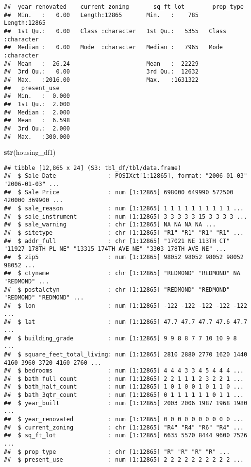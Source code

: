 \documentclass[
]{article}
\newenvironment{Shaded}{\begin{snugshade}}{\end{snugshade}}
\newcommand{\KeywordTok}[1]{\textcolor[rgb]{0.13,0.29,0.53}{\textbf{#1}}}
\newcommand{\NormalTok}[1]{#1}
\begin{document}
\begin{verbatim}
##  year_renovated    current_zoning       sq_ft_lot        prop_type        
##  Min.   :   0.00   Length:12865       Min.   :    785   Length:12865      
##  1st Qu.:   0.00   Class :character   1st Qu.:   5355   Class :character  
##  Median :   0.00   Mode  :character   Median :   7965   Mode  :character  
##  Mean   :  26.24                      Mean   :  22229                     
##  3rd Qu.:   0.00                      3rd Qu.:  12632                     
##  Max.   :2016.00                      Max.   :1631322                     
##   present_use     
##  Min.   :  0.000  
##  1st Qu.:  2.000  
##  Median :  2.000  
##  Mean   :  6.598  
##  3rd Qu.:  2.000  
##  Max.   :300.000
\end{verbatim}

\begin{Shaded}
\begin{Highlighting}[]
\KeywordTok{str}\NormalTok{(housing_df1)}
\end{Highlighting}
\end{Shaded}

\begin{verbatim}
## tibble [12,865 x 24] (S3: tbl_df/tbl/data.frame)
##  $ Sale Date               : POSIXct[1:12865], format: "2006-01-03" "2006-01-03" ...
##  $ Sale Price              : num [1:12865] 698000 649990 572500 420000 369900 ...
##  $ sale_reason             : num [1:12865] 1 1 1 1 1 1 1 1 1 1 ...
##  $ sale_instrument         : num [1:12865] 3 3 3 3 3 15 3 3 3 3 ...
##  $ sale_warning            : chr [1:12865] NA NA NA NA ...
##  $ sitetype                : chr [1:12865] "R1" "R1" "R1" "R1" ...
##  $ addr_full               : chr [1:12865] "17021 NE 113TH CT" "11927 178TH PL NE" "13315 174TH AVE NE" "3303 178TH AVE NE" ...
##  $ zip5                    : num [1:12865] 98052 98052 98052 98052 98052 ...
##  $ ctyname                 : chr [1:12865] "REDMOND" "REDMOND" NA "REDMOND" ...
##  $ postalctyn              : chr [1:12865] "REDMOND" "REDMOND" "REDMOND" "REDMOND" ...
##  $ lon                     : num [1:12865] -122 -122 -122 -122 -122 ...
##  $ lat                     : num [1:12865] 47.7 47.7 47.7 47.6 47.7 ...
##  $ building_grade          : num [1:12865] 9 9 8 8 7 7 10 10 9 8 ...
##  $ square_feet_total_living: num [1:12865] 2810 2880 2770 1620 1440 4160 3960 3720 4160 2760 ...
##  $ bedrooms                : num [1:12865] 4 4 4 3 3 4 5 4 4 4 ...
##  $ bath_full_count         : num [1:12865] 2 2 1 1 1 2 3 2 2 1 ...
##  $ bath_half_count         : num [1:12865] 1 0 1 0 0 1 0 1 1 0 ...
##  $ bath_3qtr_count         : num [1:12865] 0 1 1 1 1 1 1 0 1 1 ...
##  $ year_built              : num [1:12865] 2003 2006 1987 1968 1980 ...
##  $ year_renovated          : num [1:12865] 0 0 0 0 0 0 0 0 0 0 ...
##  $ current_zoning          : chr [1:12865] "R4" "R4" "R6" "R4" ...
##  $ sq_ft_lot               : num [1:12865] 6635 5570 8444 9600 7526 ...
##  $ prop_type               : chr [1:12865] "R" "R" "R" "R" ...
##  $ present_use             : num [1:12865] 2 2 2 2 2 2 2 2 2 2 ...
\end{verbatim}
\end{document}

